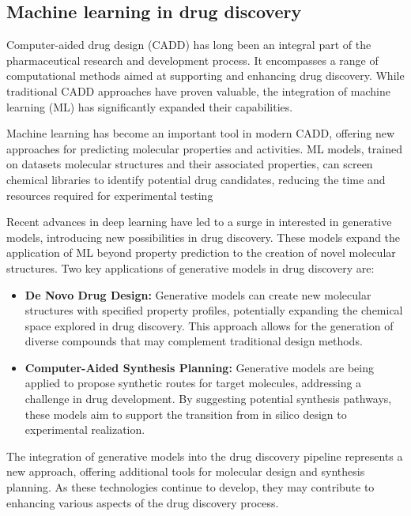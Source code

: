 \subsection{Machine learning in drug discovery}
Computer-aided drug design (CADD) has long been an integral part of the pharmaceutical research and
development process. It encompasses a range of computational methods aimed at supporting and
enhancing drug discovery. While traditional CADD approaches have proven valuable, the integration of
machine learning (ML) has significantly expanded their capabilities.

Machine learning has become an important tool in modern CADD, offering new approaches for predicting
molecular properties and activities. ML models, trained on datasets molecular structures and their
associated properties, can screen chemical libraries to identify potential drug candidates, reducing
the time and resources required for experimental testing

Recent advances in deep learning have led to a surge in interested in generative models, introducing
new possibilities in drug discovery. These models expand the application of ML beyond property
prediction to the creation of novel molecular structures. Two key applications of generative models
in drug discovery are:

\begin{itemize}
      \item \textbf{De Novo Drug Design:} Generative models can create new molecular structures with specified property
            profiles, potentially expanding the chemical space explored in drug discovery. This approach allows
            for the generation of diverse compounds that may complement traditional design methods.
      \item \textbf{Computer-Aided Synthesis Planning:} Generative models are being applied to propose synthetic routes
            for target molecules, addressing a challenge in drug development. By suggesting potential synthesis
            pathways, these models aim to support the transition from in silico design to experimental
            realization.
\end{itemize}

The integration of generative models into the drug discovery pipeline represents a new approach,
offering additional tools for molecular design and synthesis planning. As these technologies
continue to develop, they may contribute to enhancing various aspects of the drug discovery process.

